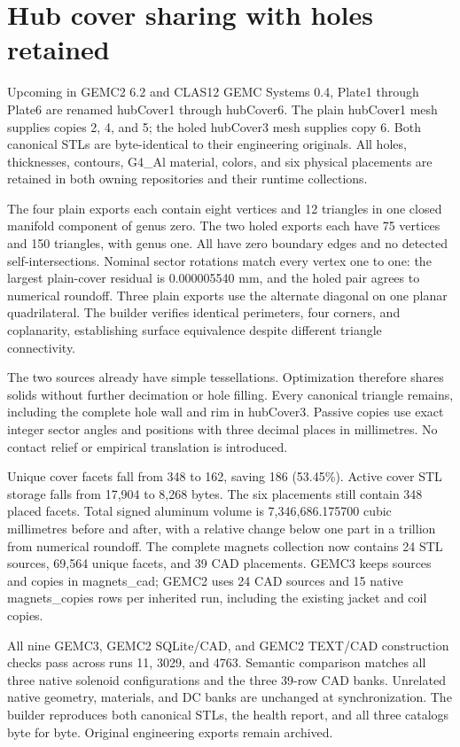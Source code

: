 \FloatBarrier
\section{Hub cover sharing with holes retained}
\label{sec:hub-covers}

Upcoming in GEMC2 6.2 and CLAS12 GEMC Systems 0.4, Plate1 through Plate6 are renamed hubCover1 through
hubCover6. The plain hubCover1 mesh supplies copies 2, 4, and 5; the holed hubCover3 mesh supplies copy 6.
Both canonical STLs are byte-identical to their engineering originals. All holes, thicknesses, contours,
G4\_Al material, colors, and six physical placements are retained in both owning repositories and their
runtime collections.

The four plain exports each contain eight vertices and 12 triangles in one closed manifold component of genus
zero. The two holed exports each have 75 vertices and 150 triangles, with genus one. All have zero boundary
edges and no detected self-intersections. Nominal sector rotations match every vertex one to one: the largest
plain-cover residual is 0.000005540 mm, and the holed pair agrees to numerical roundoff. Three plain exports
use the alternate diagonal on one planar quadrilateral. The builder verifies identical perimeters, four
corners, and coplanarity, establishing surface equivalence despite different triangle connectivity.

The two sources already have simple tessellations. Optimization therefore shares solids without further
decimation or hole filling. Every canonical triangle remains, including the complete hole wall and rim in
hubCover3. Passive copies use exact integer sector angles and positions with three decimal places in
millimetres. No contact relief or empirical translation is introduced.

Unique cover facets fall from 348 to 162, saving 186 (53.45\%). Active cover STL storage falls from 17,904 to
8,268 bytes. The six placements still contain 348 placed facets. Total signed aluminum volume is
7,346,686.175700 cubic millimetres before and after, with a relative change below one part in a trillion from
numerical roundoff. The complete magnets collection now contains 24 STL sources, 69,564 unique facets, and 39
CAD placements. GEMC3 keeps sources and copies in magnets\_cad; GEMC2 uses 24 CAD sources and 15 native
magnets\_copies rows per inherited run, including the existing jacket and coil copies.

All nine GEMC3, GEMC2 SQLite/CAD, and GEMC2 TEXT/CAD construction checks pass across runs 11, 3029, and 4763.
Semantic comparison matches all three native solenoid configurations and the three 39-row CAD banks. Unrelated
native geometry, materials, and DC banks are unchanged at synchronization. The builder reproduces both
canonical STLs, the health report, and all three catalogs byte for byte. Original engineering exports remain
archived.

